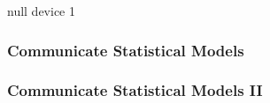 \documentclass{beamer}
\begin{document}
\begin{Schunk}
\begin{Soutput}
null device 
          1 
\end{Soutput}
\end{Schunk}

\begin{frame}
\frametitle{Communicate Statistical Models}
\vspace{.05in}
\begin{center}
\end{center}
\end{frame}




\begin{frame}
\frametitle{Communicate Statistical Models II }
\vspace{.05in}
\begin{center}
\end{center}
\end{frame}
\end{document}
